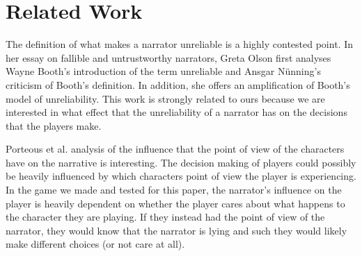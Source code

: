 \section{Related Work}
The definition of what makes a narrator unreliable is a highly contested point. In her essay on fallible and untrustworthy narrators, Greta Olson first analyses Wayne Booth's introduction of the term unreliable and Ansgar N\"unning's criticism of Booth's definition. In addition, she offers an amplification of Booth's model of unreliability\cite{Olson}. This work is strongly related to ours because we are interested in what effect that the unreliability of a narrator has on the decisions that the players make.

Porteous et al. \cite{Porteous} analysis of the influence that the point of view of the characters have on the narrative is interesting. The decision making of players could possibly be heavily influenced by which characters point of view the player is experiencing. In the game we made and tested for this paper, the narrator's influence on the player is heavily dependent on whether the player cares about what happens to the character they are playing. If they instead had the point of view of the narrator, they would know that the narrator is lying and such they would likely make different choices (or not care at all).